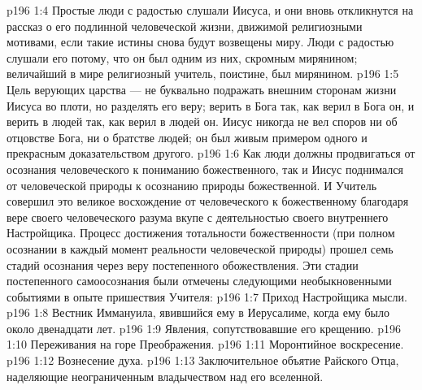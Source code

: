 \vs p196 1:4 Простые люди с радостью слушали Иисуса, и они вновь откликнутся на рассказ о его подлинной человеческой жизни, движимой религиозными мотивами, если такие истины снова будут возвещены миру. Люди с радостью слушали его потому, что он был одним из них, скромным мирянином; величайший в мире религиозный учитель, поистине, был мирянином.
\vs p196 1:5 Цель верующих царства --- не буквально подражать внешним сторонам жизни Иисуса во плоти, но разделять его веру; верить в Бога так, как верил в Бога он, и верить в людей так, как верил в людей он. Иисус никогда не вел споров ни об отцовстве Бога, ни о братстве людей; он был живым примером одного и прекрасным доказательством другого.
\vs p196 1:6 Как люди должны продвигаться от осознания человеческого к пониманию божественного, так и Иисус поднимался от человеческой природы к осознанию природы божественной. И Учитель совершил это великое восхождение от человеческого к божественному благодаря вере своего человеческого разума вкупе с деятельностью своего внутреннего Настройщика. Процесс достижения тотальности божественности (при полном осознании в каждый момент реальности человеческой природы) прошел семь стадий осознания через веру постепенного обожествления. Эти стадии постепенного самоосознания были отмечены следующими необыкновенными событиями в опыте пришествия Учителя:
\vs p196 1:7 \bibnobreakspace Приход Настройщика мысли.
\vs p196 1:8 \bibnobreakspace Вестник Иммануила, явившийся ему в Иерусалиме, когда ему было около двенадцати лет.
\vs p196 1:9 \bibnobreakspace Явления, сопутствовавшие его крещению.
\vs p196 1:10 \bibnobreakspace Переживания на горе Преображения.
\vs p196 1:11 \bibnobreakspace Моронтийное воскресение.
\vs p196 1:12 \bibnobreakspace Вознесение духа.
\vs p196 1:13 \bibnobreakspace Заключительное объятие Райского Отца, наделяющие неограниченным владычеством над его вселенной.
